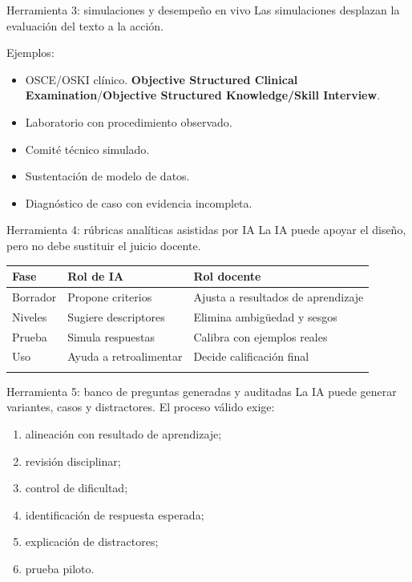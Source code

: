 \documentclass[
  ignorenonframetext,
  aspectratio=169,
  spanish,
]{beamer}
\newcounter{none} %
\providecommand{\tightlist}{%
  \setlength{\itemsep}{0pt}\setlength{\parskip}{0pt}}
\begin{document}
\begin{frame}{Herramienta 3: simulaciones y desempeño en vivo}
\protect{}\label{herramienta-3-simulaciones-y-desempeuxf1o-en-vivo}
Las simulaciones desplazan la evaluación del texto a la acción.

Ejemplos:

\begin{itemize}
\tightlist
\item
  OSCE/OSKI clínico. \textbf{Objective Structured Clinical
  Examination}/\textbf{Objective Structured Knowledge/Skill Interview}.
\item
  Laboratorio con procedimiento observado.
\item
  Comité técnico simulado.
\item
  Sustentación de modelo de datos.
\item
  Diagnóstico de caso con evidencia incompleta.
\end{itemize}
\end{frame}

\begin{frame}{Herramienta 4: rúbricas analíticas asistidas por IA}
\protect{}\label{herramienta-4-ruxfabricas-analuxedticas-asistidas-por-ia}
La IA puede apoyar el diseño, pero no debe sustituir el juicio docente.

{\def\LTcaptype{none} %
\begin{longtable}[]{@{}lll@{}}
\toprule\noalign{}
Fase & Rol de IA & Rol docente \\
\midrule\noalign{}
\endhead
Borrador & Propone criterios & Ajusta a resultados de aprendizaje \\
Niveles & Sugiere descriptores & Elimina ambigüedad y sesgos \\
Prueba & Simula respuestas & Calibra con ejemplos reales \\
Uso & Ayuda a retroalimentar & Decide calificación final \\
\bottomrule\noalign{}
\end{longtable}
}
\end{frame}

\begin{frame}{Herramienta 5: banco de preguntas generadas y auditadas}
\protect{}\label{herramienta-5-banco-de-preguntas-generadas-y-auditadas}
La IA puede generar variantes, casos y distractores. El proceso válido
exige:

\begin{enumerate}
\tightlist
\item
  alineación con resultado de aprendizaje;
\item
  revisión disciplinar;
\item
  control de dificultad;
\item
  identificación de respuesta esperada;
\item
  explicación de distractores;
\item
  prueba piloto.
\end{enumerate}
\end{frame}
\end{document}
